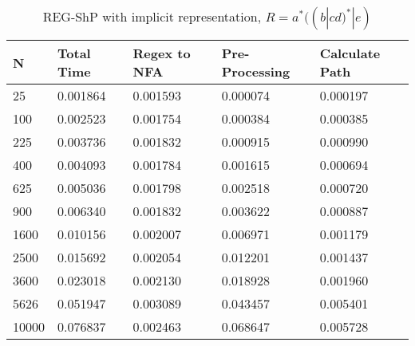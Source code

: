 \documentclass[]{article}
\numberwithin{equation}{section}
\begin{document}
\begin{appendices}
\begin{table}[H]
	\centering
	\small
	\setlength\tabcolsep{2pt}
	\begin{tabular}{|l|l|l|l|l|}
		\hline
		N     & Total Time & Regex to NFA & Pre-Processing & Calculate Path \\ \hline
		25    & 0.001864   & 0.001593     & 0.000074       & 0.000197       \\ \hline
		100   & 0.002523   & 0.001754     & 0.000384       & 0.000385       \\ \hline
		225   & 0.003736   & 0.001832     & 0.000915       & 0.000990       \\ \hline
		400   & 0.004093   & 0.001784     & 0.001615       & 0.000694       \\ \hline
		625   & 0.005036   & 0.001798     & 0.002518       & 0.000720       \\ \hline
		900   & 0.006340   & 0.001832     & 0.003622       & 0.000887       \\ \hline
		1600  & 0.010156   & 0.002007     & 0.006971       & 0.001179       \\ \hline
		2500  & 0.015692   & 0.002054     & 0.012201       & 0.001437       \\ \hline
		3600  & 0.023018   & 0.002130     & 0.018928       & 0.001960       \\ \hline
		5626  & 0.051947   & 0.003089     & 0.043457       & 0.005401       \\ \hline
		10000 & 0.076837   & 0.002463     & 0.068647       & 0.005728       \\ \hline
	\end{tabular}
	\caption{REG-ShP with implicit representation, $R = a^*((b|cd)^*|e)$}
\end{table}


\end{appendices}
\end{document}
